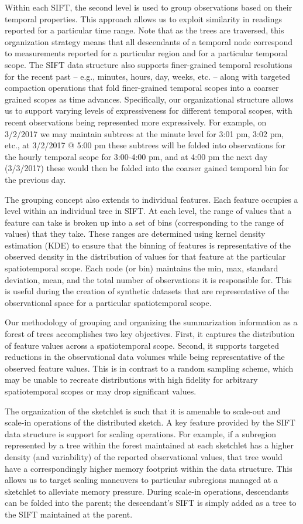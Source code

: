 Within each SIFT, the second level is used to group observations based on their temporal properties. This approach allows us to exploit similarity in readings reported for a particular time range. Note that as the trees are traversed, this organization strategy means that all descendants of a temporal node correspond to measurements reported for a particular region and for a particular temporal scope. The SIFT data structure also supports finer-grained temporal resolutions for the recent past -- e.g., minutes, hours, day, weeks, etc. -- along with targeted compaction operations that fold finer-grained temporal scopes into a coarser grained scopes as time advances. Specifically, our organizational structure allows us to support varying levels of expressiveness for different temporal scopes, with recent observations being represented more expressively. For example, on 3/2/2017 we may maintain subtrees at the minute level for 3:01 pm, 3:02 pm, etc., at 3/2/2017 @ 5:00 pm these subtrees will be folded into observations for the hourly temporal scope for 3:00-4:00 pm, and at 4:00 pm the next day (3/3/2017) these would then be folded into the coarser gained temporal bin for the previous day. 

The grouping concept also extends to individual features. Each feature occupies a level within an individual tree in SIFT. At each level, the range of values that a feature can take is broken up into a set of bins (corresponding to the range of values) that they take. These ranges are determined using kernel density estimation (KDE) to ensure that the binning of features is representative of the observed density in the distribution of values for that feature at the particular spatiotemporal scope. Each node (or bin) maintains the min, max, standard deviation, mean, and the total number of observations it is responsible for.  This is useful during the creation of synthetic datasets that are representative of the observational space for a particular spatiotemporal scope.

Our methodology of grouping and organizing the summarization information as a forest of trees accomplishes two key objectives. First, it captures the distribution of feature values across a spatiotemporal scope. Second, it supports targeted reductions in the observational data volumes while being representative of the observed feature values. This is in contrast to a random sampling scheme, which may be unable to recreate distributions with high fidelity for arbitrary spatiotemporal scopes or may drop significant values.

The organization of the sketchlet is such that it is amenable to scale-out and scale-in operations of the distributed sketch. A key feature provided by the SIFT data structure is support for scaling operations. For example, if a subregion represented by a tree within the forest maintained at each sketchlet has a higher density (and variability) of the reported observational values, that tree would have a correspondingly higher memory footprint within the data structure. This allows us to target scaling maneuvers to particular subregions managed at a sketchlet to alleviate memory pressure.  During scale-in operations, descendants can be folded into the parent; the descendant's SIFT is simply added as a tree to the SIFT maintained at the parent.
